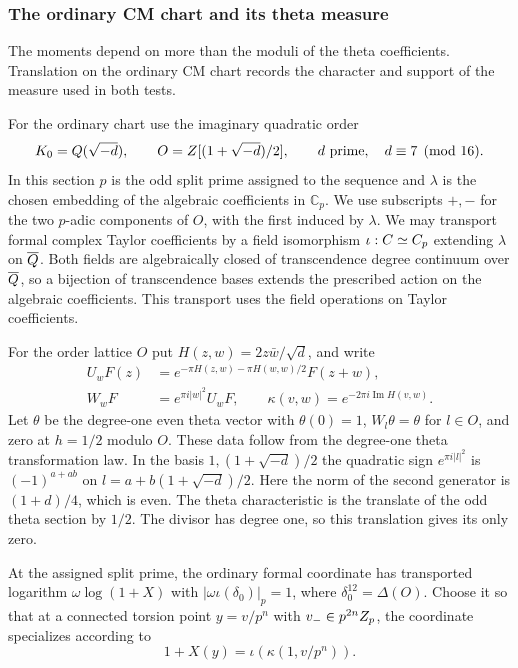 \subsubsection{The ordinary CM chart and its theta measure}
\label{subsec:word-measure}

The moments depend on more than the moduli of the theta coefficients. Translation on the ordinary CM chart records the character and support of the measure used in both tests.

For the ordinary chart use the imaginary quadratic order
\[
 K_0=Q(\sqrt{-d}),\qquad O=Z[(1+\sqrt{-d})/2],
 \qquad d\text{ prime},\quad d\equiv7\pmod{16}.
\] In this section \(p\)
is the odd split prime assigned to the sequence and \(\lambda\) is the chosen embedding
of the algebraic coefficients in \(\mathbb C_p\). We use subscripts
\(+,-\) for the two \(p\)-adic components of \(O\), with the first
induced by \(\lambda\). We may transport formal complex Taylor
coefficients by a field isomorphism \(\iota:C\simeq C_p\)
extending \(\lambda\) on \(\overline{Q}\). Both fields are
algebraically closed of transcendence degree continuum over
\(\overline{Q}\), so a bijection of transcendence bases extends
the prescribed action on the algebraic coefficients. This transport
uses the field operations on Taylor coefficients.

For the order lattice \(O\) put
\(H(z,w)=2z\bar w/\sqrt d\), and write
\[
\begin{split}
 U_wF(z)&=e^{-\pi H(z,w)-\pi H(w,w)/2}F(z+w),\\
 W_wF&=e^{\pi i |w|^2}U_wF,\qquad
 \kappa(v,w)=e^{-2\pi i\operatorname{Im}H(v,w)}.
\end{split}
\]
Let \(\theta\) be the degree-one even theta vector with
\(\theta(0)=1\), \(W_l\theta=\theta\) for \(l\in O\), and zero
at \(h=1/2\) modulo \(O\). These data follow from the
degree-one theta transformation law. In the basis
\(1,(1+\sqrt{-d})/2\) the quadratic sign
\(e^{\pi i|l|^2}\) is \((-1)^{a+ab}\) on \(l=a+b(1+\sqrt{-d})/2\).
Here the norm of the second generator is \((1+d)/4\), which is
even. The theta characteristic is the translate of the odd
theta section by \(1/2\). The divisor has degree one, so
this translation gives its only zero.

\begin{proposition}\label{prop:word-ordinary-chart}
At the assigned split prime, the ordinary formal coordinate
has transported logarithm \(\omega\log(1+X)\) with
\(|\omega\iota(\delta_0)|_p=1\), where \(\delta_0^{12}=\Delta(O)\).
Choose it so that at a connected torsion point \(y=v/p^n\)
with \(v_-\in p^{2n}Z_p\), the coordinate specializes according to
\[
 1+X(y)=\iota(\kappa(1,v/p^n)).
\]

\end{proposition}

